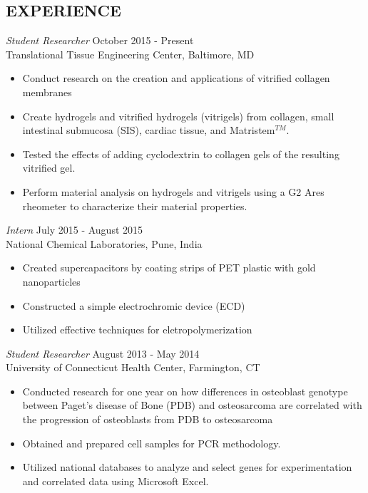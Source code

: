 \documentclass[line, 10pt]{res} %
\begin{document}
\begin{resume}
 
\section{EXPERIENCE}

{\sl Student Researcher} \hfill October 2015 - Present \\
Translational Tissue Engineering Center, Baltimore, MD
\begin{itemize}
\item Conduct research on the creation and applications of vitrified collagen membranes
\item Create hydrogels and vitrified hydrogels (vitrigels) from collagen, small intestinal submucosa (SIS), cardiac tissue, and Matristem$^{TM}$.
\item Tested the effects of adding cyclodextrin to collagen gels of the resulting vitrified gel.
\item Perform material analysis on hydrogels and vitrigels using a G2 Ares rheometer to characterize their material properties.
\end{itemize}

{\sl Intern} \hfill July 2015 - August 2015\\
National Chemical Laboratories, Pune, India
\begin{itemize}
\item Created supercapacitors by coating strips of PET plastic with gold nanoparticles 
\item Constructed a simple electrochromic device (ECD) 
\item Utilized effective techniques for eletropolymerization 
\end{itemize} 
 
{\sl Student Researcher} \hfill August 2013 - May 2014\\
University of Connecticut Health Center, Farmington, CT
\begin{itemize}
\item Conducted research for one year on how differences in osteoblast genotype between Paget’s disease of Bone (PDB) and osteosarcoma are correlated with the progression of osteoblasts from PDB to osteosarcoma
\item Obtained and prepared cell samples for PCR methodology.
\item Utilized national databases to analyze and select genes for experimentation and correlated data using Microsoft Excel.
\end{itemize} 


\end{resume}
\end{document}
